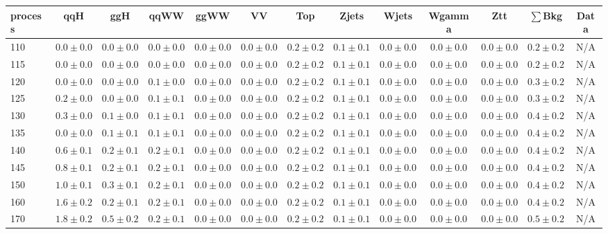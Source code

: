 \begin{table}
{%
 \tiny
 \begin{center}
 \begin{tabular}{l | c c | c c c c c c c c  | c c}
 \hline
 process & qqH & ggH & qqWW & ggWW & VV & Top & Zjets & Wjets & Wgamma & Ztt & $\sum$Bkg & Data \\
 \hline
110 & $0.0\pm0.0$ & $0.0\pm0.0$ & $0.0\pm0.0$ & $0.0\pm0.0$ & $0.0\pm0.0$ & $0.2\pm0.2$ & $0.1\pm0.1$ & $0.0\pm0.0$ & $0.0\pm0.0$ & $0.0\pm0.0$ & $0.2\pm0.2$ & N/A \\
115 & $0.0\pm0.0$ & $0.0\pm0.0$ & $0.0\pm0.0$ & $0.0\pm0.0$ & $0.0\pm0.0$ & $0.2\pm0.2$ & $0.1\pm0.1$ & $0.0\pm0.0$ & $0.0\pm0.0$ & $0.0\pm0.0$ & $0.2\pm0.2$ & N/A \\
120 & $0.0\pm0.0$ & $0.0\pm0.0$ & $0.1\pm0.0$ & $0.0\pm0.0$ & $0.0\pm0.0$ & $0.2\pm0.2$ & $0.1\pm0.1$ & $0.0\pm0.0$ & $0.0\pm0.0$ & $0.0\pm0.0$ & $0.3\pm0.2$ & N/A \\
125 & $0.2\pm0.0$ & $0.0\pm0.0$ & $0.1\pm0.1$ & $0.0\pm0.0$ & $0.0\pm0.0$ & $0.2\pm0.2$ & $0.1\pm0.1$ & $0.0\pm0.0$ & $0.0\pm0.0$ & $0.0\pm0.0$ & $0.3\pm0.2$ & N/A \\
130 & $0.3\pm0.0$ & $0.1\pm0.0$ & $0.1\pm0.1$ & $0.0\pm0.0$ & $0.0\pm0.0$ & $0.2\pm0.2$ & $0.1\pm0.1$ & $0.0\pm0.0$ & $0.0\pm0.0$ & $0.0\pm0.0$ & $0.4\pm0.2$ & N/A \\
135 & $0.0\pm0.0$ & $0.1\pm0.1$ & $0.1\pm0.1$ & $0.0\pm0.0$ & $0.0\pm0.0$ & $0.2\pm0.2$ & $0.1\pm0.1$ & $0.0\pm0.0$ & $0.0\pm0.0$ & $0.0\pm0.0$ & $0.4\pm0.2$ & N/A \\
140 & $0.6\pm0.1$ & $0.2\pm0.1$ & $0.2\pm0.1$ & $0.0\pm0.0$ & $0.0\pm0.0$ & $0.2\pm0.2$ & $0.1\pm0.1$ & $0.0\pm0.0$ & $0.0\pm0.0$ & $0.0\pm0.0$ & $0.4\pm0.2$ & N/A \\
145 & $0.8\pm0.1$ & $0.2\pm0.1$ & $0.2\pm0.1$ & $0.0\pm0.0$ & $0.0\pm0.0$ & $0.2\pm0.2$ & $0.1\pm0.1$ & $0.0\pm0.0$ & $0.0\pm0.0$ & $0.0\pm0.0$ & $0.4\pm0.2$ & N/A \\
150 & $1.0\pm0.1$ & $0.3\pm0.1$ & $0.2\pm0.1$ & $0.0\pm0.0$ & $0.0\pm0.0$ & $0.2\pm0.2$ & $0.1\pm0.1$ & $0.0\pm0.0$ & $0.0\pm0.0$ & $0.0\pm0.0$ & $0.4\pm0.2$ & N/A \\
160 & $1.6\pm0.2$ & $0.2\pm0.1$ & $0.2\pm0.1$ & $0.0\pm0.0$ & $0.0\pm0.0$ & $0.2\pm0.2$ & $0.1\pm0.1$ & $0.0\pm0.0$ & $0.0\pm0.0$ & $0.0\pm0.0$ & $0.4\pm0.2$ & N/A \\
170 & $1.8\pm0.2$ & $0.5\pm0.2$ & $0.2\pm0.1$ & $0.0\pm0.0$ & $0.0\pm0.0$ & $0.2\pm0.2$ & $0.1\pm0.1$ & $0.0\pm0.0$ & $0.0\pm0.0$ & $0.0\pm0.0$ & $0.5\pm0.2$ & N/A \\

\end{tabular}
\end{center}}
\end{table}
